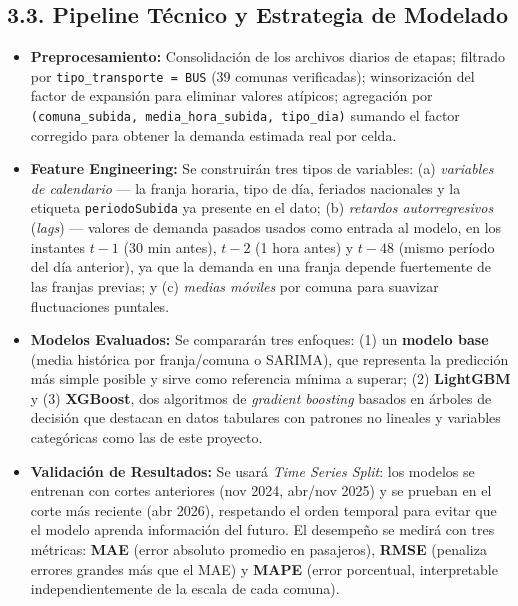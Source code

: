 \documentclass[11pt,letterpaper]{article}
\begin{document}
\subsection*{3.3. Pipeline Técnico y Estrategia de Modelado}
\begin{itemize}
    \item \textbf{Preprocesamiento:} Consolidación de los archivos diarios de etapas; filtrado por \texttt{tipo\_transporte = BUS} (39 comunas verificadas); winsorización del factor de expansión para eliminar valores atípicos; agregación por \texttt{(comuna\_subida, media\_hora\_subida, tipo\_dia)} sumando el factor corregido para obtener la demanda estimada real por celda.
    \item \textbf{Feature Engineering:} Se construirán tres tipos de variables: (a) \textit{variables de calendario} — la franja horaria, tipo de día, feriados nacionales y la etiqueta \texttt{periodoSubida} ya presente en el dato; (b) \textit{retardos autorregresivos} (\textit{lags}) — valores de demanda pasados usados como entrada al modelo, en los instantes $t-1$ (30 min antes), $t-2$ (1 hora antes) y $t-48$ (mismo período del día anterior), ya que la demanda en una franja depende fuertemente de las franjas previas; y (c) \textit{medias móviles} por comuna para suavizar fluctuaciones puntales.
    \item \textbf{Modelos Evaluados:} Se compararán tres enfoques: (1) un \textbf{modelo base} (media histórica por franja/comuna o SARIMA), que representa la predicción más simple posible y sirve como referencia mínima a superar; (2) \textbf{LightGBM} y (3) \textbf{XGBoost}, dos algoritmos de \textit{gradient boosting} basados en árboles de decisión que destacan en datos tabulares con patrones no lineales y variables categóricas como las de este proyecto.
    \item \textbf{Validación de Resultados:} Se usará \textit{Time Series Split}: los modelos se entrenan con cortes anteriores (nov 2024, abr/nov 2025) y se prueban en el corte más reciente (abr 2026), respetando el orden temporal para evitar que el modelo aprenda información del futuro. El desempeño se medirá con tres métricas: \textbf{MAE} (error absoluto promedio en pasajeros), \textbf{RMSE} (penaliza errores grandes más que el MAE) y \textbf{MAPE} (error porcentual, interpretable independientemente de la escala de cada comuna).
\end{itemize}

\end{document}
